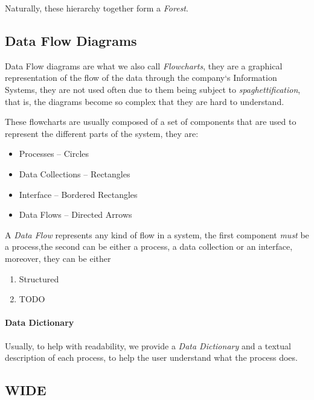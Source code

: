 \documentclass[openright, twoside, twocolumn]{report}
\begin{document}
    Naturally, these hierarchy together form a \emph{Forest}. 

    \subsection{Data Flow Diagrams} 
    
    Data Flow diagrams are what we also call \emph{Flowcharts}, they are a graphical 
    representation of the flow of the data through the company`s Information Systems, 
    they are not used often due to them being subject to \emph{spaghettification}, 
    that is, the diagrams become so complex that they are hard to understand.

    These flowcharts are usually composed of a set of components that are used to represent 
    the different parts of the system, they are:
    \begin{itemize}
      \item Processes -- Circles
      \item Data Collections -- Rectangles
      \item Interface -- Bordered Rectangles
      \item Data Flows -- Directed Arrows
    \end{itemize}

    \begin{definition}
      A \emph{Data Flow} represents any kind of flow in a system, the first component \emph{must} 
      be a process,the second can be either a process, a data collection or an interface, moreover, 
      they can be either 
      \begin{enumerate}
        \item Structured
        \item TODO
      \end{enumerate}
    \end{definition}

    \paragraph{Data Dictionary} 
    
    Usually, to help with readability, we provide a \emph{Data Dictionary} and a textual description of each process, 
    to help the user understand what the process does.

    \subsection{WIDE}
\end{document}
